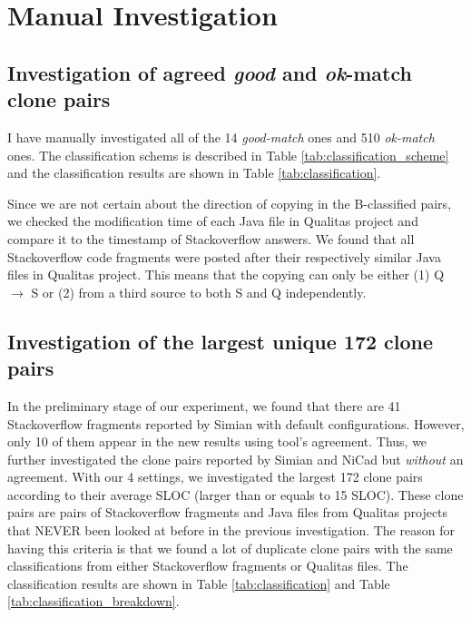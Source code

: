 \documentclass{IEEEtran}
\begin{document}
\section*{Manual Investigation}

\subsection{Investigation of agreed \textit{good} and \textit{ok}-match clone pairs}
I have manually investigated all of the 14 \textit{good-match} ones and 510 \textit{ok-match} ones. The classification schems is described in Table \ref{tab:classification_scheme} and the classification results are shown in Table \ref{tab:classification}. 

Since we are not certain about the direction of copying in the B-classified pairs, we checked the modification time of each Java file in Qualitas project and compare it to the timestamp of Stackoverflow answers. We found that all Stackoverflow code fragments were posted after their respectively similar Java files in Qualitas project. This means that the copying can only be either (1) Q $\rightarrow$ S or (2) from a third source to both S and Q independently.

\subsection{Investigation of the largest unique 172 clone pairs}
In the preliminary stage of our experiment, we found that there are 41 Stackoverflow fragments reported by Simian with default configurations. However, only 10 of them appear in the new results using tool's agreement. Thus, we further investigated the clone pairs reported by Simian and NiCad but \textit{without} an agreement. With our 4 settings, we investigated the largest 172 clone pairs according to their average SLOC (larger than or equals to 15 SLOC). These clone pairs are pairs of Stackoverflow fragments and Java files from Qualitas projects that NEVER been looked at before in the previous investigation. The reason for having this criteria is that we found a lot of duplicate clone pairs with the same classifications from either Stackoverflow fragments or Qualitas files. The classification results are shown in Table \ref{tab:classification} and Table \ref{tab:classification_breakdown}.
\end{document}
